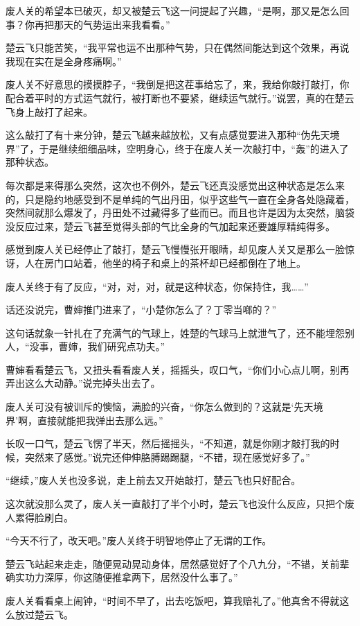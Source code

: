 废人关的希望本已破灭，却又被楚云飞这一问提起了兴趣，“是啊，那又是怎么回事？你再把那天的气势运出来我看看。”

楚云飞只能苦笑，“我平常也运不出那种气势，只在偶然间能达到这个效果，再说我现在实在是全身疼痛啊。”

废人关不好意思的摸摸脖子，“我倒是把这茬事给忘了，来，我给你敲打敲打，你配合着平时的方式运气就行，被打断也不要紧，继续运气就行。”说罢，真的在楚云飞身上敲打了起来。

这么敲打了有十来分钟，楚云飞越来越放松，又有点感觉要进入那种“伪先天境界”了，于是继续细细品味，空明身心，终于在废人关一次敲打中，“轰”的进入了那种状态。

每次都是来得那么突然，这次也不例外，楚云飞还真没感觉出这种状态是怎么来的，只是隐约地感受到不是单纯的气出丹田，似乎这些气一直在全身各处隐藏着，突然间就那么爆发了，丹田处不过藏得多了些而已。而且也许是因为太突然，脑袋没反应过来，楚云飞甚至觉得头部的气比全身的气加起来还要雄厚精纯得多。

感觉到废人关已经停止了敲打，楚云飞慢慢张开眼睛，却见废人关又是那么一脸惊讶，人在房门口站着，他坐的椅子和桌上的茶杯却已经都倒在了地上。

废人关终于有了反应，“对，对，对，就是这种状态，你保持住，我……”

话还没说完，曹婶推门进来了，“小楚你怎么了？丁零当啷的？”

这句话就象一针扎在了充满气的气球上，姓楚的气球马上就泄气了，还不能埋怨别人，“没事，曹婶，我们研究点功夫。”

曹婶看看楚云飞，又扭头看看废人关，摇摇头，叹口气，“你们小心点儿啊，别再弄出这么大动静。”说完掉头出去了。

废人关可没有被训斥的懊恼，满脸的兴奋，“你怎么做到的？这就是‘先天境界’啊，直接就能把我弹出去那么远。”

长叹一口气，楚云飞愣了半天，然后摇摇头，“不知道，就是你刚才敲打我的时候，突然来了感觉。”说完还伸伸胳膊踢踢腿，“不错，现在感觉好多了。”

“继续，”废人关也没多说，走上前去又开始敲打，楚云飞也只好配合。

这次就没那么灵了，废人关一直敲打了半个小时，楚云飞也没什么反应，只把个废人累得脸刷白。

“今天不行了，改天吧。”废人关终于明智地停止了无谓的工作。

楚云飞站起来走走，随便晃动晃动身体，居然感觉好了个八九分，“不错，关前辈确实功力深厚，你这随便推拿两下，居然没什么事了。”

废人关看看桌上闹钟，“时间不早了，出去吃饭吧，算我赔礼了。”他真舍不得就这么放过楚云飞。

